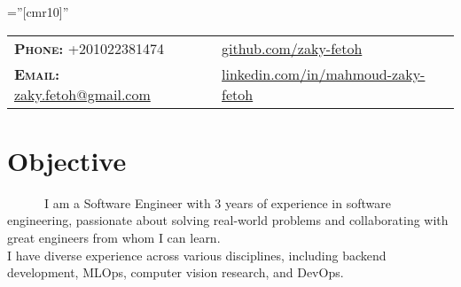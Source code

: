 \documentclass[a4paper,10pt]{article}
\begin{document}
\pagestyle{fancy}
\fancyhead{} 
\renewcommand{\headrulewidth}{0pt}

\font\fb=''[cmr10]'' 
\par{\bigskip\par} %


\begin{tabular}{lp{4cm}l}
\textbf{\textsc{Phone:}} +201022381474 && \href{https://github.com/zaky-fetoh}{github.com/zaky-fetoh} \\
\textbf{\textsc{Email:}}   \href{mailto:zaky.fetoh@gmail.com}{zaky.fetoh@gmail.com} &&\href{https://www.linkedin.com/in/mahmoud-zaky-fetoh/}{linkedin.com/in/mahmoud-zaky-fetoh}\\

\end{tabular}

\section{\textbf{Objective}}
~~~~~~I am a Software Engineer with 3 years of experience in software engineering, passionate about solving real-world problems and collaborating with great engineers from whom I can learn. \\
I have diverse experience across various disciplines, including backend development, MLOps, computer vision research, and DevOps. 
\end{document}
